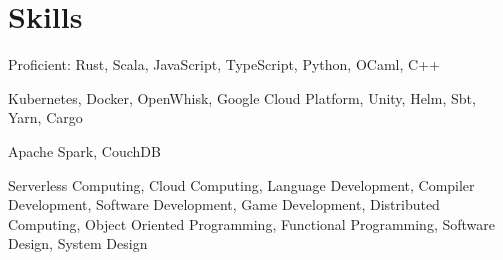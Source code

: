 \section{Skills}

%
{}%
{}%
{\small Proficient: Rust, Scala, JavaScript, TypeScript, Python, OCaml, C++%
\normalsize}%
{}

%
{}%
{}%
{\small Kubernetes, Docker, OpenWhisk, Google Cloud Platform, Unity, Helm, Sbt,
Yarn, Cargo \normalsize}%
{}

%
{}%
{}%
{\small Apache Spark, CouchDB \normalsize}%
{}

%
{}%
{}%
{\small Serverless Computing, Cloud Computing, Language Development, Compiler
Development, Software Development, Game Development, Distributed Computing,
Object Oriented Programming, Functional Programming, Software Design, System
Design \normalsize}%
{}